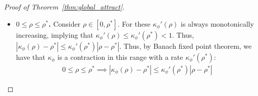 \documentclass[twoside]{article}
\newcommand{\km}{\kappa_\phi}
\theoremstyle{definition}
\begin{document}
\begin{proof}[Proof of Theorem~\ref{thm:global_attract}]
\begin{itemize}

\item \textbf{$0\le \rho \le \rho^*$.}
Consider $\rho \in [0,\rho^*]$. For these $\km'(\rho)$ is always monotonically increasing, implying that $\km'(\rho)\le \km'(\rho^*) < 1$. Thus, $|\km(\rho)-\rho^*| \le \km'(\rho^*) |\rho - \rho^*|$. Thus, by Banach fixed point theorem, we have that $\km$ is a contraction in this range with a rate $\km'(\rho^*)$:
\begin{align*}
0\le \rho \le \rho^* \implies |\km(\rho) - \rho^*| \le \km'(\rho^*) |\rho-\rho^*|
\end{align*}


\end{itemize}
\end{proof}
\end{document}
